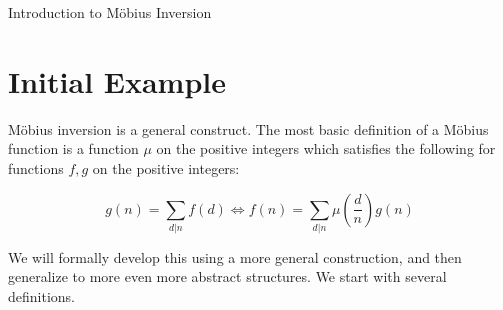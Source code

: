 \documentclass[12pt]{pom_thesis}
\begin{document}
\begin{chapter}{Introduction to M\"obius Inversion}
\section{Initial Example}
M\"obius inversion is a general construct. The most basic definition of a M\"obius function is a function $\mu$ on the positive integers which satisfies the following for functions $f,g$ on the positive integers:

\begin{equation}\label{init_mob} %
g(n) = \sum_{d | n} f(d) \iff f(n) = \sum_{d | n} \mu\left(\frac dn\right) g(n)
\end{equation}


We will formally develop this using a more general construction, and then generalize to more even more abstract structures. We start with several definitions.

\end{chapter}
\end{document}
